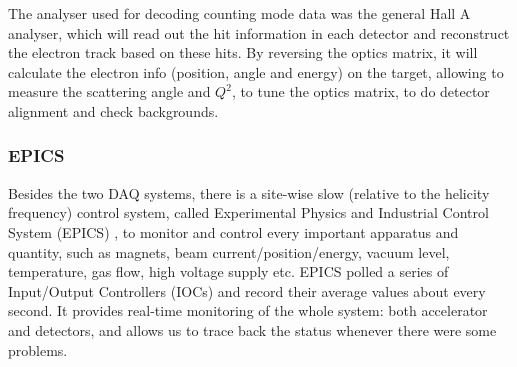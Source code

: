 The analyser used for decoding counting mode data was the general Hall A analyser,
which will read out the hit information in each detector and reconstruct the 
electron track based on these hits. By reversing the optics matrix, it will
calculate the electron info (position, angle and energy) on the target, allowing
to measure the scattering angle and $Q^2$, to tune the optics matrix, 
to do detector alignment and check backgrounds.

\subsubsection{EPICS}
Besides the two DAQ systems, there is a site-wise slow (relative to the helicity frequency) 
control system, called Experimental Physics and Industrial Control System (EPICS) \cite{EPICS},
to monitor and control every important apparatus and quantity, such as magnets, 
beam current/position/energy, vacuum level, temperature, gas flow, 
high voltage supply etc. EPICS polled a series of 
Input/Output Controllers (IOCs) and record their average values about every second.
It provides real-time monitoring of the whole system: both accelerator and detectors, and
allows us to trace back the status whenever there were some problems.
